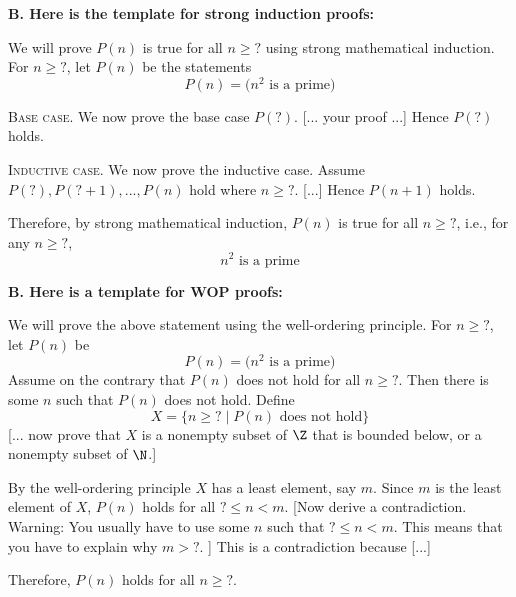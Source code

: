\textbf{B. Here is the template for strong induction proofs:}

We will prove $P(n)$ is true for all $n \geq ?$ using
strong mathematical induction.
For $n \geq ?$, let $P(n)$ be the statements
\[
  P(n) = \biggl( n^2 \text{ is a prime} \biggr)
\]

\textsc{Base case}.
We now prove the base case $P(?)$. [... your proof ...]
Hence $P(?)$ holds.

\textsc{Inductive case}.
We now prove the inductive case.
Assume $P(?), P(?+1), ..., P(n)$ hold where $n \geq ?$. 
[...]
Hence $P(n + 1)$ holds.

Therefore, by strong mathematical induction,
$P(n)$ is true for all $n \geq ?$, i.e.,
for any $n \geq ?$,
\[
  n^2 \text{ is a prime}
\]

\textbf{B. Here is a template for WOP proofs:}

We will prove the above statement using the well-ordering principle.
For $n \geq ?$, let $P(n)$ be 
\[
  P(n) = \biggl( n^2 \text{ is a prime} \biggr)
\]
Assume on the contrary that $P(n)$ does not hold for all $n \geq ?$.
Then there is some $n$ such that $P(n)$ does not hold.
Define
\[
X = \{ n \geq ? \mid P(n) \text{ does not hold} \}
\]
[... now prove that $X$ is a nonempty subset of $\Z$ that is bounded below,
  or a nonempty subset of $\N$.]

By the well-ordering principle $X$ has a least element, say $m$.
Since $m$ is the least element of $X$,
$P(n)$ holds for all $? \leq n < m$.
[Now derive a contradiction.
  Warning: You usually have to use some $n$ such that 
  $? \leq n < m$.
  This means that you have to explain why $m > ?$.
]
This is a contradiction because [...]

Therefore, $P(n)$ holds for all $n \geq ?$.


